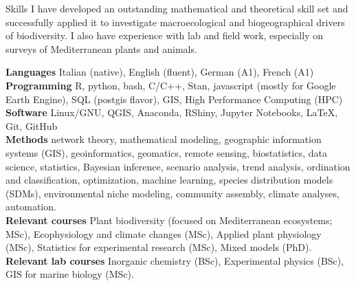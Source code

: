 \documentclass{resume} %
\begin{document}
\begin{rSection}{Skills}
I have developed an outstanding mathematical and theoretical skill set and successfully applied it to investigate macroecological and biogeographical drivers of biodiversity.
I also have experience with lab and field work, especially on surveys of Mediterranean plants and animals.

{\bf Languages} Italian (native), English (fluent), German (A1), French (A1)\\
{\bf Programming} R, python, bash, C/C++, Stan, javascript (mostly for Google Earth Engine), SQL (postgis flavor), GIS, High Performance Computing (HPC)\\
{\bf Software} Linux/GNU, QGIS, Anaconda, RShiny, Jupyter Notebooks, \LaTeX, Git, GitHub\\
{\bf Methods} 
network theory,
mathematical modeling,
geographic information systems (GIS),
geoinformatics,
geomatics,
remote sensing,
biostatistics,
data science,
statistics,
Bayesian inference,
scenario analysis,
trend analysis,
ordination and classification,
optimization,
machine learning,
species distribution models (SDMs),
environmental niche modeling,
community assembly,
climate analyses,
automation.\\
{\bf Relevant courses} Plant biodiversity (focused on Mediterranean ecosystems; MSc), Ecophysiology and climate changes (MSc), Applied plant physiology (MSc), Statistics for experimental research (MSc), Mixed models (PhD).\\
{\bf Relevant lab courses} Inorganic chemistry (BSc), Experimental physics (BSc), GIS for marine biology (MSc).
\end{rSection}

\clearpage
\end{document}
